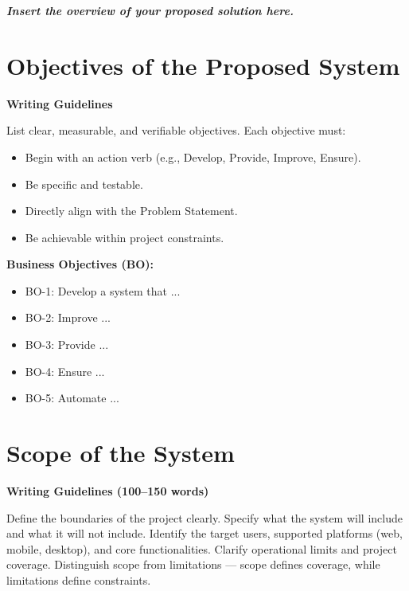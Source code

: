 \textbf{\textit{Insert the overview of your proposed solution here.}}




\section{Objectives of the Proposed System}

\textbf{Writing Guidelines}

List clear, measurable, and verifiable objectives. Each objective must:
\begin{itemize}
    \item Begin with an action verb (e.g., Develop, Provide, Improve, Ensure).
    \item Be specific and testable.
    \item Directly align with the Problem Statement.
    \item Be achievable within project constraints.
\end{itemize}

\vspace{0.3cm}

\textbf{Business Objectives (BO):}

\begin{itemize}
    \item BO-1: Develop a system that ...
    \item BO-2: Improve ...
    \item BO-3: Provide ...
    \item BO-4: Ensure ...
    \item BO-5: Automate ...
\end{itemize}




\section{Scope of the System}

\textbf{Writing Guidelines (100–150 words)}

Define the boundaries of the project clearly. Specify what the system 
will include and what it will not include. Identify the target users, 
supported platforms (web, mobile, desktop), and core functionalities. 
Clarify operational limits and project coverage. Distinguish scope 
from limitations — scope defines coverage, while limitations define 
constraints.


